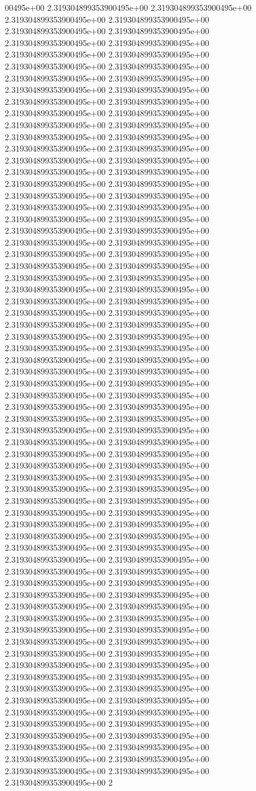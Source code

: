 00495e+00	2.319304899353900495e+00	2.319304899353900495e+00	2.319304899353900495e+00	2.319304899353900495e+00	2.319304899353900495e+00	2.319304899353900495e+00	2.319304899353900495e+00	2.319304899353900495e+00	2.319304899353900495e+00	2.319304899353900495e+00	2.319304899353900495e+00	2.319304899353900495e+00	2.319304899353900495e+00	2.319304899353900495e+00	2.319304899353900495e+00	2.319304899353900495e+00	2.319304899353900495e+00	2.319304899353900495e+00	2.319304899353900495e+00	2.319304899353900495e+00	2.319304899353900495e+00	2.319304899353900495e+00	2.319304899353900495e+00	2.319304899353900495e+00	2.319304899353900495e+00	2.319304899353900495e+00	2.319304899353900495e+00	2.319304899353900495e+00	2.319304899353900495e+00	2.319304899353900495e+00	2.319304899353900495e+00	2.319304899353900495e+00	2.319304899353900495e+00	2.319304899353900495e+00	2.319304899353900495e+00	2.319304899353900495e+00	2.319304899353900495e+00	2.319304899353900495e+00	2.319304899353900495e+00	2.319304899353900495e+00	2.319304899353900495e+00	2.319304899353900495e+00	2.319304899353900495e+00	2.319304899353900495e+00	2.319304899353900495e+00	2.319304899353900495e+00	2.319304899353900495e+00	2.319304899353900495e+00	2.319304899353900495e+00	2.319304899353900495e+00	2.319304899353900495e+00	2.319304899353900495e+00	2.319304899353900495e+00	2.319304899353900495e+00	2.319304899353900495e+00	2.319304899353900495e+00	2.319304899353900495e+00	2.319304899353900495e+00	2.319304899353900495e+00	2.319304899353900495e+00	2.319304899353900495e+00	2.319304899353900495e+00	2.319304899353900495e+00	2.319304899353900495e+00	2.319304899353900495e+00	2.319304899353900495e+00	2.319304899353900495e+00	2.319304899353900495e+00	2.319304899353900495e+00	2.319304899353900495e+00	2.319304899353900495e+00	2.319304899353900495e+00	2.319304899353900495e+00	2.319304899353900495e+00	2.319304899353900495e+00	2.319304899353900495e+00	2.319304899353900495e+00	2.319304899353900495e+00	2.319304899353900495e+00	2.319304899353900495e+00	2.319304899353900495e+00	2.319304899353900495e+00	2.319304899353900495e+00	2.319304899353900495e+00	2.319304899353900495e+00	2.319304899353900495e+00	2.319304899353900495e+00	2.319304899353900495e+00	2.319304899353900495e+00	2.319304899353900495e+00	2.319304899353900495e+00	2.319304899353900495e+00	2.319304899353900495e+00	2.319304899353900495e+00	2.319304899353900495e+00	2.319304899353900495e+00	2.319304899353900495e+00	2.319304899353900495e+00	2.319304899353900495e+00	2.319304899353900495e+00	2.319304899353900495e+00	2.319304899353900495e+00	2.319304899353900495e+00	2.319304899353900495e+00	2.319304899353900495e+00	2.319304899353900495e+00	2.319304899353900495e+00	2.319304899353900495e+00	2.319304899353900495e+00	2.319304899353900495e+00	2.319304899353900495e+00	2.319304899353900495e+00	2.319304899353900495e+00	2.319304899353900495e+00	2.319304899353900495e+00	2.319304899353900495e+00	2.319304899353900495e+00	2.319304899353900495e+00	2.319304899353900495e+00	2.319304899353900495e+00	2.319304899353900495e+00	2.319304899353900495e+00	2.319304899353900495e+00	2.319304899353900495e+00	2.319304899353900495e+00	2.319304899353900495e+00	2.319304899353900495e+00	2.319304899353900495e+00	2.319304899353900495e+00	2.319304899353900495e+00	2.319304899353900495e+00	2.319304899353900495e+00	2.319304899353900495e+00	2